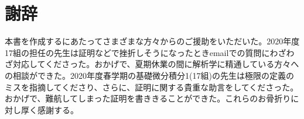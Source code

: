 \section*{謝辞}
本書を作成するにあたってさまざまな方々からのご援助をいただいた。2020年度17組の担任の先生は証明などで挫折しそうになったときemailでの質問にわざわざ対応してくださった。おかげで、夏期休業の間に解析学に精通している方々への相談ができた。2020年度春学期の基礎微分積分1(17組)の先生は極限の定義のミスを指摘してくださり、さらに、証明に関する貴重な助言をしてくださった。おかげで、難航してしまった証明を書ききることができた。これらのお骨折りに対し厚く感謝する。